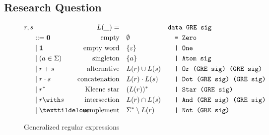 \subsection{Research Question}
\label{sec:research-question}

\begin{figure}[tp]
  \begin{align*}
    r, s & &L(\_)=\quad &  &
                             \makebox[1em][l]{\code{data GRE sig}}\\
         & ::= \Rnull & \ltext{empty}
                        & \emptyset
                           &&\code{= Zero}\\
         & \mid \Rempty & \ltext{empty word}
                        & \{ \varepsilon \}
                           && \code{| One}\\
         & \mid (a \in \Sigma) & \ltext{singleton}
                        &  \{ a \}
                           && \code{| Atom sig} \\
         & \mid \Runion rs & \ltext{alternative}
                        &  L (r) \cup L (s)
                           && \code{| Or (GRE sig) (GRE sig)}\\
         & \mid \Rconcat rs & \ltext{concatenation}
                        &  L (r) \cdot L (s)
                           && \code{| Dot (GRE sig) (GRE sig)}\\
         & \mid \Rstar r & \ltext{Kleene star}
                        & (L (r))^* 
                           && \code{| Star (GRE sig)}\\
         & \mid \Rintersect rs & \ltext{intersection}
                        & L (r) \cap L (s)
                           && \code{| And (GRE sig) (GRE sig)}\\
         & \mid \Rcomplement r & \ltext{complement}
                        & \Sigma^* \setminus L (r)
                           && \code{| Not (GRE sig)}
  \end{align*}
  \caption{Generalized regular expressions}
  \label{fig:generalized-regular-expressions}
\end{figure}

